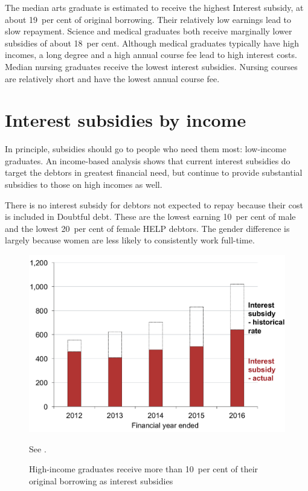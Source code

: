 \documentclass{grattan}
\begin{document}
The median arts graduate is estimated to receive the highest \gls{Interest subsidy}, at about 19~per cent of original borrowing.
Their relatively low earnings lead to slow repayment.
Science and medical graduates both receive marginally lower subsidies of about 18~per cent.
Although medical graduates typically have high incomes, a long degree and a high annual course fee lead to high interest costs.
Median nursing graduates receive the lowest interest subsidies.
Nursing courses are relatively short and have the lowest annual course fee.

\section{Interest subsidies by income}\label{sec:interest-subsidies-by-income}

In principle, subsidies should go to people who need them most: low-income graduates.
An income-based analysis shows that current interest subsidies do target the debtors in greatest financial need, but continue to provide substantial subsidies to those on high incomes as well.

There is no interest subsidy for debtors not expected to repay because their cost is included in \gls{Doubtful debt}.
These are the lowest earning 10~per cent of male and the lowest 20~per cent of female \gls{HELP} debtors.
The gender difference is largely because women are less likely to consistently work full-time.


\begin{figure}[t]\vspace{1pt}
\caption{High-income graduates receive more than 10~per cent of their original borrowing as interest subsidies}\label{fig:fig10-highest-income-grads-receive-over-10pc-original-borrowing-interest-subsidy}

\includegraphics[page=10]{atlas/Chartpack.pdf}

%
{{See .}}
\end{figure}
\end{document}
